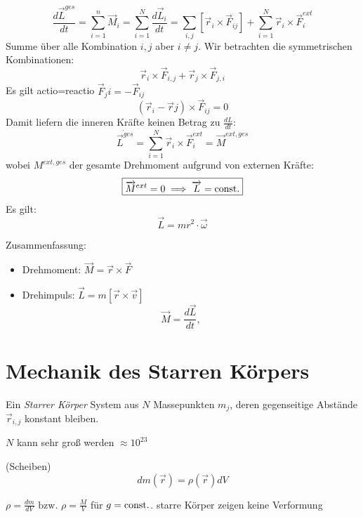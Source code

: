 \documentclass[a4paper,10pt]{scrartcl}
\begin{document}
\[
 \frac{d\vec  L^{ges}}{dt}=\sum_{i=1}^n \vec M_i=\sum_{i=1}^N \frac{d\vec L_i}{dt}= \sum_{i,j} [\vec r_i\times \vec F_{ij}]+ \sum_{i=1}^N \vec r_i \times \vec F_i^{ext}
\]
Summe über alle Kombination $i,j$ aber $i\neq j$. Wir betrachten die symmetrischen Kombinationen:
\[
 \vec r_i\times \vec F_{i,j}+\vec r_j \times \vec F_{j,i}
\]
Es gilt actio=reactio $\vec F_ji=-\vec F_{ij}$
\[
 (\vec r_i- \vec rj) \times \vec F_{ij}=0
\]
Damit liefern die inneren Kräfte keinen Betrag zu $\frac{dL}{dt}$:
\[
 \dot {\vec L^{ges}}= \sum_{i=1}^N  \vec r_i \times  \vec F_i^{ext}= \vec M^{ext, ges}
\]
wobei $M^{ext, ges}$ der gesamte Drehmoment aufgrund von externen Kräfte:
\[
 \boxed{\overrightarrow{M}^{ext}=0 \implies \overrightarrow{L}= \text{const}.}
\]
Es gilt:
\[
 \boxed{\vec L= mr^2\cdot \vec \omega}
\]
\begin{seg}{Zusammenfassung:}
 \begin{itemize}
  \item Drehmoment: $\boxed{\vec M= \vec r \times \vec F}$
  \item Drehimpuls: $\boxed{\vec L= m[\vec r \times \vec v]}$
\[
 \boxed{\vec M=\frac{d\vec{L}}{dt}}, \qquad
\]
 \end{itemize}
\end{seg}
\section{Mechanik des Starren Körpers}
\begin{df}
 Ein \emph{Starrer Körper} System aus $N$ Massepunkten $m_j$, deren gegenseitige Abstände $\vec r_{i,j}$ konstant bleiben.
\end{df}
\begin{note}
 $N$ kann sehr groß werden $\approx 10^23$
\end{note}
\begin{ex}(Scheiben)
\[
 dm(\vec r)=\rho (\vec r) dV
\]

$ \rho= \frac{dm}{dV} \text{ bzw. } \rho=\frac{M}{V} $ für $g=\text{const}.$. starre Körper zeigen keine Verformung 
\end{ex}
\end{document}
